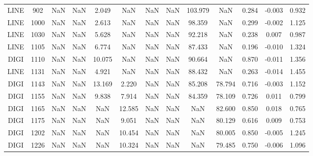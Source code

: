 \begin{table}[h]
\begin{tabular}{ccccccccccccc}
		LINE & 902    & NaN        & NaN        & 2.049      & NaN        & NaN    & NaN     & 103.979 & NaN    & 0.284     & -0.003   & 0.932     \\
		\rowcolor[HTML]{EFEFEF} 
		LINE & 1000   & NaN        & NaN        & 2.613      & NaN        & NaN    & NaN     & 98.359  & NaN    & 0.299     & -0.002   & 1.125     \\
		LINE & 1030   & NaN        & NaN        & 5.628      & NaN        & NaN    & NaN     & 92.218  & NaN    & 0.238     & 0.007    & 0.987     \\
		\rowcolor[HTML]{EFEFEF} 
		LINE & 1105   & NaN        & NaN        & 6.774      & NaN        & NaN    & NaN     & 87.433  & NaN    & 0.196     & -0.010   & 1.324     \\
		DIGI & 1110   & NaN        & NaN        & 10.075     & NaN        & NaN    & NaN     & 90.664  & NaN    & 0.870     & -0.011   & 1.356     \\
		\rowcolor[HTML]{EFEFEF} 
		LINE & 1131   & NaN        & NaN        & 4.921      & NaN        & NaN    & NaN     & 88.432  & NaN    & 0.263     & -0.014   & 1.455     \\
		DIGI & 1143   & NaN        & NaN        & 13.169     & 2.220      & NaN    & NaN     & 85.208  & 78.794 & 0.716     & -0.003   & 1.152     \\
		\rowcolor[HTML]{EFEFEF} 
		DIGI & 1155   & NaN        & NaN        & 9.838      & 7.914      & NaN    & NaN     & 84.359  & 78.109 & 0.726     & 0.011    & 0.799     \\
		DIGI & 1165   & NaN        & NaN        & NaN        & 12.585     & NaN    & NaN     & NaN     & 82.600 & 0.850     & 0.018    & 0.765     \\
		\rowcolor[HTML]{EFEFEF} 
		DIGI & 1175   & NaN        & NaN        & NaN        & 9.051      & NaN    & NaN     & NaN     & 80.129 & 0.616     & 0.009    & 0.753     \\
		DIGI & 1202   & NaN        & NaN        & NaN        & 10.454     & NaN    & NaN     & NaN     & 80.005 & 0.850     & -0.005   & 1.245     \\
		\rowcolor[HTML]{EFEFEF} 
		DIGI & 1226   & NaN        & NaN        & NaN        & 10.324     & NaN    & NaN     & NaN     & 79.485 & 0.750     & -0.006   & 1.096     \\ \hline
	\end{tabular}
\end{table}